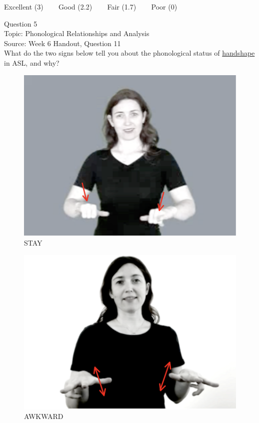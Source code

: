 \documentclass[12pt]{article}
\begin{document}
\vfill
Excellent (3) ~~~ Good (2.2) ~~~ Fair (1.7) ~~~ Poor (0)
\newpage

{\large Question 5}\\

Topic: Phonological Relationships and Analysis\\
Source: Week 6 Handout, Question 11\\

What do the two signs below tell you about the phonological status of \underline{handshape} in ASL, and why?\\

\begin{figure}[H]
\includegraphics{../images/asl_stay.png}
\caption{STAY}
\end{figure}
\begin{figure}[H]
\includegraphics{../images/asl_awkward.png}
\caption{AWKWARD}
\end{figure}
\end{document}

